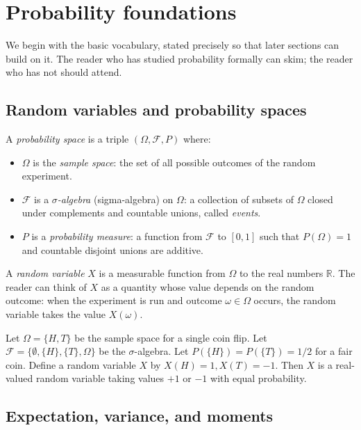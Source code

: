 \section{Probability foundations}
\label{sec:probability-basics}

We begin with the basic vocabulary, stated precisely so that later
sections can build on it. The reader who has studied probability
formally can skim; the reader who has not should attend.

\subsection{Random variables and probability spaces}

A \emph{probability space} is a triple $(\Omega, \mathcal{F}, P)$ where:

\begin{itemize}[leftmargin=2em]
    \item $\Omega$ is the \emph{sample space}: the set of all
    possible outcomes of the random experiment.
    \item $\mathcal{F}$ is a \emph{$\sigma$-algebra} (sigma-algebra)
    on $\Omega$: a collection of subsets of $\Omega$ closed under
    complements and countable unions, called \emph{events}.
    \item $P$ is a \emph{probability measure}: a function from
    $\mathcal{F}$ to $[0, 1]$ such that $P(\Omega) = 1$ and
    countable disjoint unions are additive.
\end{itemize}

A \emph{random variable} $X$ is a measurable function from $\Omega$
to the real numbers $\mathbb{R}$. The reader can think of $X$ as a
quantity whose value depends on the random outcome: when the
experiment is run and outcome $\omega \in \Omega$ occurs, the random
variable takes the value $X(\omega)$.

\begin{example}
Let $\Omega = \{H, T\}$ be the sample space for a single coin flip.
Let $\mathcal{F} = \{\emptyset, \{H\}, \{T\}, \Omega\}$ be the
$\sigma$-algebra. Let $P(\{H\}) = P(\{T\}) = 1/2$ for a fair coin.
Define a random variable $X$ by $X(H) = 1, X(T) = -1$. Then $X$ is
a real-valued random variable taking values $+1$ or $-1$ with equal
probability.
\end{example}

\subsection{Expectation, variance, and moments}

